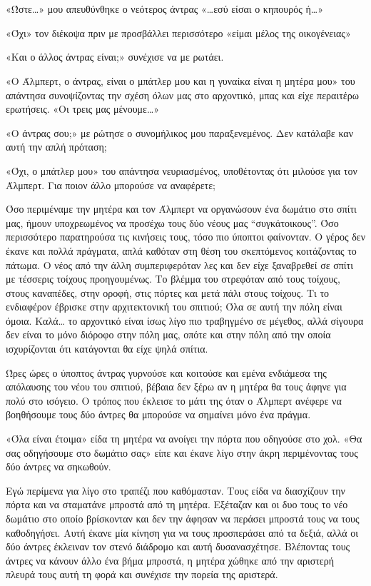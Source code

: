 \documentclass[12pt,twoside, openany]{book}
\begin{document}
\chapter{}

«Ώστε…» μου απευθύνθηκε ο νεότερος άντρας «…εσύ είσαι ο κηπουρός ή…»

«Όχι» τον διέκοψα πριν με προσβάλλει περισσότερο «είμαι μέλος της οικογένειας»

«Και ο άλλος άντρας είναι;» συνέχισε να με ρωτάει.

«Ο Άλμπερτ, ο άντρας, είναι ο μπάτλερ μου και η γυναίκα είναι η μητέρα μου» του απάντησα συνοψίζοντας την σχέση όλων μας στο αρχοντικό, μπας και είχε περαιτέρω ερωτήσεις. «Οι τρεις μας μένουμε…»

«Ο άντρας σου;» με ρώτησε ο συνομήλικος μου παραξενεμένος. Δεν κατάλαβε καν αυτή την απλή πρόταση;

«Όχι, ο μπάτλερ μου» του απάντησα νευριασμένος, υποθέτοντας ότι μιλούσε για τον Άλμπερτ. Για ποιον άλλο μπορούσε να αναφέρετε;

Όσο περιμέναμε την μητέρα και τον Άλμπερτ να οργανώσουν ένα δωμάτιο στο σπίτι μας, ήμουν υποχρεωμένος να προσέχω τους δύο νέους μας “συγκάτοικους”. Όσο περισσότερο παρατηρούσα τις κινήσεις τους, τόσο πιο ύποπτοι φαίνονταν. Ο γέρος δεν έκανε και πολλά πράγματα, απλά καθόταν στη θέση του σκεπτόμενος κοιτάζοντας το πάτωμα. Ο νέος από την άλλη συμπεριφερόταν λες και δεν είχε ξαναβρεθεί σε σπίτι με τέσσερις τοίχους προηγουμένως. Το βλέμμα του στρεφόταν από τους τοίχους, στους καναπέδες, στην οροφή, στις πόρτες και μετά πάλι στους τοίχους. Τι το ενδιαφέρον έβρισκε στην αρχιτεκτονική του σπιτιού; Όλα σε αυτή την πόλη είναι όμοια. Καλά… το αρχοντικό είναι ίσως λίγο πιο τραβηγμένο σε μέγεθος, αλλά σίγουρα δεν είναι το μόνο διόροφο στην πόλη μας, οπότε και στην πόλη από την οποία ισχυρίζονται ότι κατάγονται θα είχε ψηλά σπίτια. 

Ώρες ώρες ο ύποπτος άντρας γυρνούσε και κοιτούσε και εμένα ενδιάμεσα της απόλαυσης του νέου του σπιτιού, βέβαια δεν ξέρω αν η μητέρα θα τους άφηνε για πολύ στο ισόγειο. Ο τρόπος που έκλεισε το μάτι της όταν ο Άλμπερτ ανέφερε να βοηθήσουμε τους δύο άντρες θα μπορούσε να σημαίνει μόνο ένα πράγμα.

«Όλα είναι έτοιμα» είδα τη μητέρα να ανοίγει την πόρτα που οδηγούσε στο χολ. «Θα σας οδηγήσουμε στο δωμάτιο σας» είπε και έκανε λίγο στην άκρη περιμένοντας τους δύο άντρες να σηκωθούν. 

Εγώ περίμενα για λίγο στο τραπέζι που καθόμασταν. Τους είδα να διασχίζουν την πόρτα και να σταματάνε μπροστά από τη μητέρα. Εξέταζαν και οι δυο τους το νέο δωμάτιο στο οποίο βρίσκονταν και δεν την άφησαν να περάσει μπροστά τους να τους καθοδηγήσει. Αυτή έκανε μία κίνηση για να τους προσπεράσει από τα δεξιά, αλλά οι δύο άντρες έκλειναν τον στενό διάδρομο και αυτή δυσανασχέτησε. Βλέποντας τους άντρες να κάνουν άλλο ένα βήμα μπροστά, η μητέρα χώθηκε από την αριστερή πλευρά τους αυτή τη φορά και συνέχισε την πορεία της αριστερά.
\end{document}
